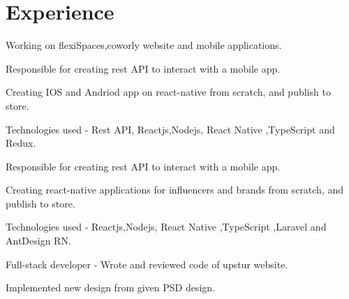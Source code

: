 \documentclass[]{deedy-resume-openfont}
\begin{document}
\begin{minipage}[t]{0.66\textwidth} 


\section{Experience}
\vspace{\topsep} %
\begin{tightemize}
\item Working on flexiSpaces,coworly website and mobile applications. 
\item Responsible for creating rest API to interact with a mobile app.
\item Creating IOS and Andriod app on react-native from scratch, and publish to store.
\item Technologies used - Rest API, Reactjs,Nodejs, React Native ,TypeScript and Redux.
\end{tightemize}
\sectionsep

\vspace{\topsep} %
\begin{tightemize}
\item Responsible for creating rest API to interact with a mobile app.
\item Creating react-native applications for influencers and brands from scratch, and publish to store.
\item Technologies used - Reactjs,Nodejs, React Native ,TypeScript ,Laravel and AntDesign RN.
\end{tightemize}
\sectionsep

\vspace{\topsep} %
\begin{tightemize}
\item Full-stack developer - Wrote and reviewed code of upstur website.
\item Implemented new design from given PSD design.
\end{tightemize}
\sectionsep


\end{minipage}
\end{document}

